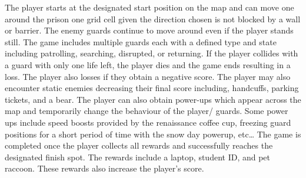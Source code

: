 \documentclass[11pt]{article}
\begin{document}
The player starts at the designated start position on the map and can move one around the prison one grid cell given the direction chosen is not blocked by a wall or barrier. The enemy guards continue to move around even if the player stands still. The game includes multiple guards each with a defined type and state including patrolling, searching, disrupted, or returning. If the player collides with a guard with only one life left, the player dies and the game ends resulting in a loss. The player also losses if they obtain a negative score. The player may also encounter static enemies decreasing their final score including, handcuffs, parking tickets, and a bear. The player can also obtain power-ups which appear across the map and temporarily change the behaviour of the player/ guards. Some power ups include speed boosts provided by the renaissance coffee cup, freezing guard positions for a short period of time with the snow day powerup, etc… The game is completed once the player collects all rewards and successfully reaches the designated finish spot. The rewards include a laptop, student ID, and pet raccoon. These rewards also increase the player's score.
\end{document}

